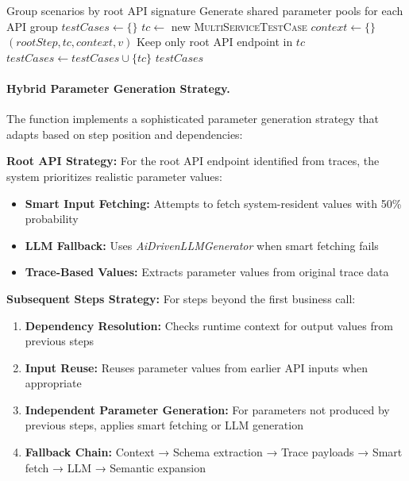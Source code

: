 \documentclass[conference]{IEEEtran}
\begin{document}
\begin{algorithm}[tb]
\caption{MULTI\_SERVICE\_TEST\_GENERATOR}\label{alg:generate}
\footnotesize
\begin{algorithmic}[1]
\Require{}
\Ensure{}
\State Group scenarios by root API signature
\State Generate shared parameter pools for each API group
\State $testCases \gets \{\}$
        \State $tc \gets$ new \textsc{MultiServiceTestCase}
        \State $context \gets \{\}$ 
            \State {}$(rootStep, tc, context, v)$
        \EndFor
            \State Keep only root API endpoint in $tc$
        \EndIf
        \State $testCases \gets testCases \cup \{tc\}$
    \EndFor
\EndFor
\State \Return $testCases$
\end{algorithmic}
\end{algorithm}

\paragraph{Hybrid Parameter Generation Strategy.}
The  function implements a sophisticated parameter generation strategy that adapts based on step position and dependencies:

\textbf{Root API Strategy:} For the root API endpoint identified from traces, the system prioritizes realistic parameter values:
\begin{itemize}[leftmargin=*]
  \item \textbf{Smart Input Fetching:} Attempts to fetch system-resident values with 50\% probability
  \item \textbf{LLM Fallback:} Uses \emph{AiDrivenLLMGenerator} when smart fetching fails
  \item \textbf{Trace-Based Values:} Extracts parameter values from original trace data
\end{itemize}

\textbf{Subsequent Steps Strategy:} For steps beyond the first business call:
\begin{enumerate}[leftmargin=*]
  \item \textbf{Dependency Resolution:} Checks runtime context for output values from previous steps
  \item \textbf{Input Reuse:} Reuses parameter values from earlier API inputs when appropriate
  \item \textbf{Independent Parameter Generation:} For parameters not produced by previous steps, applies smart fetching or LLM generation
  \item \textbf{Fallback Chain:} Context → Schema extraction → Trace payloads → Smart fetch → LLM → Semantic expansion
\end{enumerate}
\end{document}
